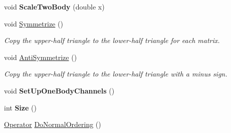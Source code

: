 \begin{DoxyCompactItemize}
\item 
\hypertarget{classOperator_af1f244c4856d11c21f94b6c6cd24a555}{void {\bfseries Scale\-Two\-Body} (double x)}\label{classOperator_af1f244c4856d11c21f94b6c6cd24a555}

\item 
\hypertarget{classOperator_a98d4075d734523186162492a4a45b420}{void \hyperlink{classOperator_a98d4075d734523186162492a4a45b420}{Symmetrize} ()}\label{classOperator_a98d4075d734523186162492a4a45b420}

\begin{DoxyCompactList}\small\item\em Copy the upper-\/half triangle to the lower-\/half triangle for each matrix. \end{DoxyCompactList}\item 
\hypertarget{classOperator_a21a37daa051c248109153e6502b8280f}{void \hyperlink{classOperator_a21a37daa051c248109153e6502b8280f}{Anti\-Symmetrize} ()}\label{classOperator_a21a37daa051c248109153e6502b8280f}

\begin{DoxyCompactList}\small\item\em Copy the upper-\/half triangle to the lower-\/half triangle with a minus sign. \end{DoxyCompactList}\item 
\hypertarget{classOperator_ad6168f16f6c0b2cf70a1fc0676e70523}{void {\bfseries Set\-Up\-One\-Body\-Channels} ()}\label{classOperator_ad6168f16f6c0b2cf70a1fc0676e70523}

\item 
\hypertarget{classOperator_ad140b7310167d34c8490ad86f2193f52}{int {\bfseries Size} ()}\label{classOperator_ad140b7310167d34c8490ad86f2193f52}

\item 
\hypertarget{classOperator_a622880b91a902c832b867c6447a262e7}{\hyperlink{classOperator}{Operator} \hyperlink{classOperator_a622880b91a902c832b867c6447a262e7}{Do\-Normal\-Ordering} ()}\label{classOperator_a622880b91a902c832b867c6447a262e7}


\end{DoxyCompactItemize}
